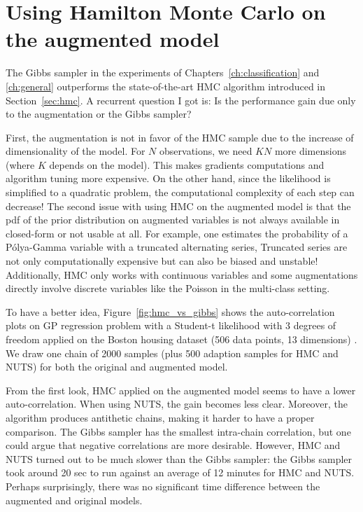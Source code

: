 \section{Using Hamilton Monte Carlo on the augmented model}

The Gibbs sampler in the experiments of Chapters~\ref{ch:classification} and \ref{ch:general} outperforms the state-of-the-art \ac{HMC} algorithm introduced in Section~\ref{sec:hmc}.
A recurrent question I got is:
Is the performance gain due only to the augmentation or the Gibbs sampler?

First, the augmentation is not in favor of the \ac{HMC} sample due to the increase of dimensionality of the model.
For $N$ observations, we need $KN$ more dimensions (where $K$ depends on the model).
This makes gradients computations and algorithm tuning more expensive.
On the other hand, since the likelihood is simplified to a quadratic problem, the computational complexity of each step can decrease!
The second issue with using \ac{HMC} on the augmented model is that the \ac{pdf} of the prior distribution on augmented variables is not always available in closed-form or not usable at all.
For example, one estimates the probability of a P\'olya-Gamma variable with a truncated alternating series,
Truncated series are not only computationally expensive but can also be biased and unstable!
Additionally, \ac{HMC} only works with continuous variables and some augmentations directly involve discrete variables like the Poisson in the multi-class setting.

To have a better idea, Figure~\ref{fig:hmc_vs_gibbs} shows the auto-correlation plots on \ac{GP} regression problem with a Student-t likelihood with 3 degrees of freedom applied on the Boston housing dataset (506 data points, 13 dimensions) \cite{harrison1978hedonic}.
We draw one chain of 2000 samples (plus 500 adaption samples for \ac{HMC} and \ac{NUTS}) for both the original and augmented model.

From the first look, \ac{HMC} applied on the augmented model seems to have a lower auto-correlation.
When using \ac{NUTS}, the gain becomes less clear.
Moreover, the algorithm produces antithetic chains, making it harder to have a proper comparison.
The Gibbs sampler has the smallest intra-chain correlation, but one could argue that negative correlations are more desirable.
However, \ac{HMC} and \ac{NUTS} turned out to be much slower than the Gibbs sampler:
the Gibbs sampler took around 20 sec to run against an average of 12 minutes for \ac{HMC} and \ac{NUTS}.
Perhaps surprisingly, there was no significant time difference between the augmented and original models.

